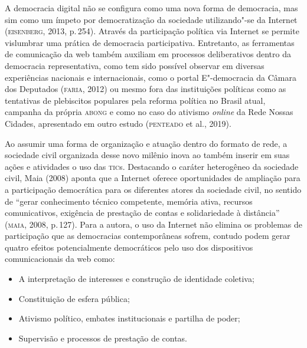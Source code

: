 A democracia digital não se configura como uma nova forma de democracia,
mas sim como um ímpeto por democratização da sociedade utilizando"-se da
Internet (\textsc{eisenberg}, 2013, p.\,254). Através da participação política via
Internet se permite vislumbrar uma prática de democracia participativa.
Entretanto, as ferramentas de comunicação da web também auxiliam em
processos deliberativos dentro da democracia representativa, como tem
sido possível observar em diversas experiências nacionais e
internacionais, como o portal E"-democracia da Câmara dos Deputados
(\textsc{faria}, 2012) ou mesmo fora das instituições políticas como as
tentativas de plebiscitos populares pela reforma política no Brasil
atual, campanha da própria \textsc{abong} e como no caso do ativismo \textit{online} da
Rede Nossas Cidades, apresentado em outro estudo (\textsc{penteado} et al.,
2019).

Ao assumir uma forma de organização e atuação dentro do formato de rede,
a sociedade civil organizada desse novo milênio inova ao também inserir
em suas ações e atividades o uso das \textsc{tic}s. Destacando o caráter
heterogêneo da sociedade civil, Maia (2008) aponta que a Internet
oferece oportunidades de ampliação para a participação democrática para
os diferentes atores da sociedade civil, no sentido de ``gerar
conhecimento técnico competente, memória ativa, recursos comunicativos,
exigência de prestação de contas e solidariedade à distância'' (\textsc{maia},
2008, p.\,127). Para a autora, o uso da Internet não elimina os problemas
de participação que as democracias contemporâneas sofrem, contudo podem
gerar quatro efeitos potencialmente democráticos pelo uso dos
dispositivos comunicacionais da web como: 

\begin{itemize}
\item A interpretação de
interesses e construção de identidade coletiva; 
\item Constituição de esfera pública; 
\item Ativismo político, embates institucionais e partilha de poder; 
\item Supervisão e processos de prestação de contas.
\end{itemize}

